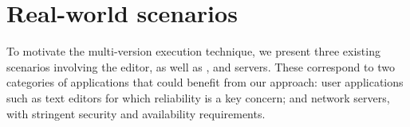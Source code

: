 \section{Real-world scenarios}
\label{multi-version:scenarios}

To motivate the multi-version execution technique, we present three existing
scenarios involving the \vim editor, as well as \lighttpd, and \redis servers.
These correspond to two categories of applications that could benefit from our
approach: user applications such as text editors for which reliability is a key
concern; and network servers, with stringent security and availability
requirements.





